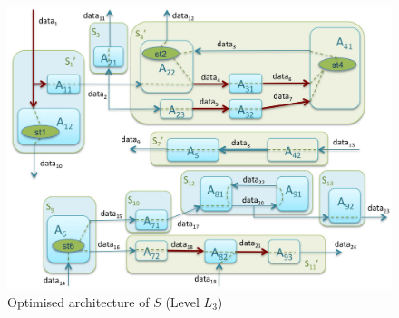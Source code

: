 \begin{figure}[ht!]
  \begin{center}
   \includegraphics[scale=0.15]{fig/remote.pdf}
    \caption{%
    Optimised architecture of $S$  (Level $L_{3}$)}
    \label{fig:remote}
  \end{center}
\end{figure} 


